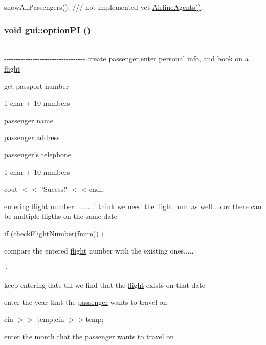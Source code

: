 showAllPassengers(); /// not implemented yet \hyperlink{classgui_ae39757d1c6bdbfa938dbe3226a36febb}{AirlineAgents()}; \hypertarget{classgui_a1da09a34a60debec7214d3f2d9691c73}{
\subsubsection[{optionPI}]{\setlength{\rightskip}{0pt plus 5cm}void gui::optionPI ()}}
\label{classgui_a1da09a34a60debec7214d3f2d9691c73}
-\/-\/-\/-\/-\/-\/-\/-\/-\/-\/-\/-\/-\/-\/-\/-\/-\/-\/-\/-\/-\/-\/-\/-\/-\/-\/-\/-\/-\/-\/-\/-\/-\/-\/-\/-\/-\/-\/-\/-\/-\/-\/-\/-\/-\/-\/-\/-\/-\/-\/-\/-\/-\/-\/-\/-\/-\/-\/-\/-\/-\/-\/-\/-\/-\/-\/-\/-\/-\/-\/-\/-\/-\/-\/-\/-\/-\/-\/-\/-\/-\/-\/-\/-\/-\/-\/-\/-\/-\/-\/-\/-\/-\/-\/-\/-\/-\/-\/-\/-\/-\/-\/-\/-\/-\/-\/-\/-\/-\/-\/-\/-\/-\/-\/-\/-\/-\/-\/-\/-\/-\/-\/-\/-\/-\/-\/-\/-\/-\/-\/-\/-\/-\/-\/-\/-\/-\/-\/-\/-\/-\/-\/ create \hyperlink{classpassenger}{passenger},enter personal info, and book on a \hyperlink{classflight}{flight} 

get passport number

1 char + 10 numbers

\hyperlink{classpassenger}{passenger} name

\hyperlink{classpassenger}{passenger} address

passenger's telephone

1 char + 10 numbers

cout $<$$<$ \char`\"{}Sucess!\char`\"{} $<$$<$endl;

entering \hyperlink{classflight}{flight} number..........i think we need the \hyperlink{classflight}{flight} num as well....coz there can be multiple fligths on the same date

if (checkFlightNumber(fnum)) \{

compare the entered \hyperlink{classflight}{flight} number with the existing ones.....

\}

keep entering date till we find that the \hyperlink{classflight}{flight} exists on that date

enter the year that the \hyperlink{classpassenger}{passenger} wants to travel on

cin $>$$>$ temp;cin $>$$>$temp;

enter the month that the \hyperlink{classpassenger}{passenger} wants to travel on

